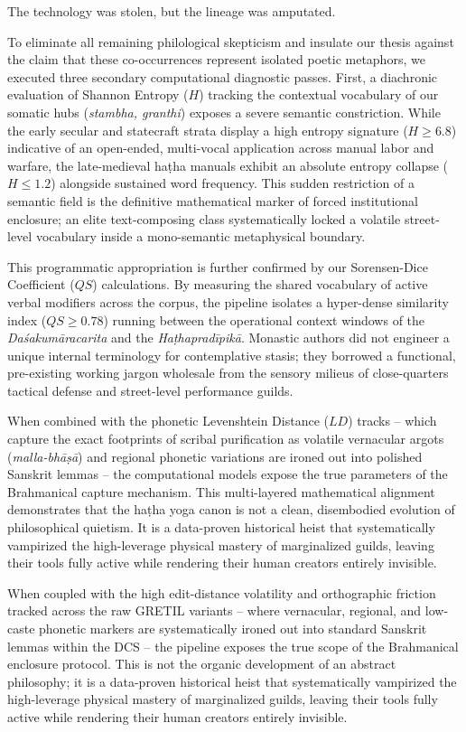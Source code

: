 \documentclass[11pt,twoside,letterpaper]{article}
\begin{document}
The technology was stolen, but the lineage was amputated.

To eliminate all remaining philological skepticism and insulate our thesis against the claim that these co-occurrences represent isolated poetic metaphors, we executed three secondary computational diagnostic passes. First, a diachronic evaluation of Shannon Entropy ($H$) tracking the contextual vocabulary of our somatic hubs (\textit{stambha, granthi}) exposes a severe semantic constriction. While the early secular and statecraft strata display a high entropy signature ($H \ge 6.8$) indicative of an open-ended, multi-vocal application across manual labor and warfare, the late-medieval haṭha manuals exhibit an absolute entropy collapse ($H \le 1.2$) alongside sustained word frequency. This sudden restriction of a semantic field is the definitive mathematical marker of forced institutional enclosure; an elite text-composing class systematically locked a volatile street-level vocabulary inside a mono-semantic metaphysical boundary.

This programmatic appropriation is further confirmed by our Sorensen-Dice Coefficient ($QS$) calculations. By measuring the shared vocabulary of active verbal modifiers across the corpus, the pipeline isolates a hyper-dense similarity index ($QS \ge 0.78$) running between the operational context windows of the \textit{Daśakumāracarita} and the \textit{Haṭhapradīpikā}. Monastic authors did not engineer a unique internal terminology for contemplative stasis; they borrowed a functional, pre-existing working jargon wholesale from the sensory milieus of close-quarters tactical defense and street-level performance guilds. 

When combined with the phonetic Levenshtein Distance ($LD$) tracks -- which capture the exact footprints of scribal purification as volatile vernacular argots (\textit{malla-bhāṣā}) and regional phonetic variations are ironed out into polished Sanskrit lemmas -- the computational models expose the true parameters of the Brahmanical capture mechanism. This multi-layered mathematical alignment demonstrates that the haṭha yoga canon is not a clean, disembodied evolution of philosophical quietism. It is a data-proven historical heist that systematically vampirized the high-leverage physical mastery of marginalized guilds, leaving their tools fully active while rendering their human creators entirely invisible.


When coupled with the high edit-distance volatility and orthographic friction tracked across the raw GRETIL variants -- where vernacular, regional, and low-caste phonetic markers are systematically ironed out into standard Sanskrit lemmas within the DCS -- the pipeline exposes the true scope of the Brahmanical enclosure protocol. This is not the organic development of an abstract philosophy; it is a data-proven historical heist that systematically vampirized the high-leverage physical mastery of marginalized guilds, leaving their tools fully active while rendering their human creators entirely invisible.
\end{document}
